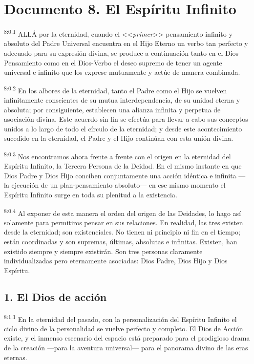 \chapter{Documento 8. El Espíritu Infinito}
\par
\textsuperscript{8:0.1} ALLÁ por la eternidad, cuando el <<\textit{primer}>> pensamiento infinito y absoluto del Padre Universal encuentra en el Hijo Eterno un verbo tan perfecto y adecuado para su expresión divina, se produce a continuación tanto en el Dios-Pensamiento como en el Dios-Verbo el deseo supremo de tener un agente universal e infinito que los exprese mutuamente y actúe de manera combinada.

\par
\textsuperscript{8:0.2} En los albores de la eternidad, tanto el Padre como el Hijo se vuelven infinitamente conscientes de su mutua interdependencia, de su unidad eterna y absoluta; por consiguiente, establecen una alianza infinita y perpetua de asociación divina. Este acuerdo sin fin se efectúa para llevar a cabo sus conceptos unidos a lo largo de todo el círculo de la eternidad; y desde este acontecimiento sucedido en la eternidad, el Padre y el Hijo continúan con esta unión divina.

\par
\textsuperscript{8:0.3} Nos encontramos ahora frente a frente con el origen en la eternidad del Espíritu Infinito, la Tercera Persona de la Deidad. En el mismo instante en que Dios Padre y Dios Hijo conciben conjuntamente una acción idéntica e infinita ---la ejecución de un plan-pensamiento absoluto--- en ese mismo momento el Espíritu Infinito surge en toda su plenitud a la existencia.

\par
\textsuperscript{8:0.4} Al exponer de esta manera el orden del origen de las Deidades, lo hago así solamente para permitiros pensar en sus relaciones. En realidad, las tres existen desde la eternidad; son existenciales. No tienen ni principio ni fin en el tiempo; están coordinadas y son supremas, últimas, absolutas e infinitas. Existen, han existido siempre y siempre existirán. Son tres personas claramente individualizadas pero eternamente asociadas: Dios Padre, Dios Hijo y Dios Espíritu.

\section*{1. El Dios de acción}
\par
\textsuperscript{8:1.1} En la eternidad del pasado, con la personalización del Espíritu Infinito el ciclo divino de la personalidad se vuelve perfecto y completo. El Dios de Acción existe, y el inmenso escenario del espacio está preparado para el prodigioso drama de la creación ---para la aventura universal--- para el panorama divino de las eras eternas.

